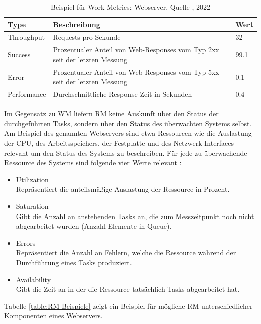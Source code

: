 \bigbreak
\begin{table}[H]
    \centering
    \caption{Beispiel für Work-Metrics: Webserver, Quelle \autocite{le-quoc_2015}, 2022} 
    \tiny
        \begin{tabular}{lll}
            \hline
            Type & Beschreibung & Wert\\
            \hline\hline
            Throughput & Requests pro Sekunde & 32\\
            Success & Prozentualer Anteil von Web-Responses vom Typ 2xx seit der letzten Messung & 99.1\\
            Error & Prozentualer Anteil von Web-Responses vom Typ 5xx seit der letzten Messung & 0.1\\
            Performance & Durchschnittliche Response-Zeit in Sekunden & 0.4\\
        \end{tabular}
        \label{table:WM-Beispiele}
\end{table}
\bigbreak
Im Gegensatz zu WM liefern RM keine Auskunft über den Status der durchgeführten Tasks, sondern über den Status des überwachten Systems selbst. Am Beispiel des genannten Webservers sind etwa Ressourcen wie die Auslastung der CPU, des Arbeitsspeichers, der Festplatte und des Netzwerk-Interfaces relevant um den Status des Systems zu beschreiben.
\bigbreak
Für jede zu überwachende Ressource des Systems sind folgende vier Werte relevant \autocite{le-quoc_2015}:
\begin{itemize}
    \item Utilization\\
    Repräsentiert die anteilsmäßige Auslastung der Ressource in Prozent.
    \item Saturation\\
    Gibt die Anzahl an anstehenden Tasks an, die zum Messzeitpunkt noch nicht abgearbeitet wurden (Anzahl Elemente in Queue).
    \item Errors\\
    Repräsentiert die Anzahl an Fehlern, welche die Ressource während der Durchführung eines Tasks produziert.
    \item Availability\\
    Gibt die Zeit an in der die Ressource tatsächlich Tasks abgearbeitet hat. 
\end{itemize}
\bigbreak
Tabelle \ref{table:RM-Beispiele} zeigt ein Beispiel für mögliche RM unterschiedlicher Komponenten eines Webservers. 
\bigbreak
